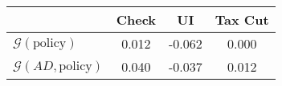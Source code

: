 \begin{tabular}{@{}lccc@{}} 
\toprule 
                          & Check      & UI    & Tax Cut    \\  \midrule 
$\mathcal{G}(\text{policy})$ & 0.012  & -0.062  & 0.000     \\ 
$\mathcal{G}(AD,\text{policy})$ & 0.040  & -0.037  & 0.012     \\ 
\end{tabular}  
